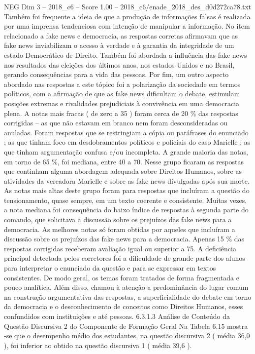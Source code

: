 \begin{textsample}{NEG Dim 3 – 2018\_c6 – Score 1.00 – 2018\_c6/enade\_2018\_des\_d0d272ca78.txt}
Também foi frequente a ideia de que a produção de informações falsas é realizada por uma imprensa tendenciosa com intenção de manipular a informação.
No item relacionado a fake news e democracia, as respostas corretas afirmavam que as fake news inviabilizam o acesso à verdade e à garantia da integridade de um estado Democrático de Direito.
Também foi abordada a influência das fake news nos resultados das eleições dos últimos anos, nos estados Unidos e no Brasil, gerando consequências para a vida das pessoas.
Por fim, um outro aspecto abordado nas respostas a este tópico foi a polarização da sociedade em termos políticos, com a afirmação de que as fake news dificultam o debate, estimulam posições extremas e rivalidades prejudiciais à convivência em uma democracia plena.
A notas mais fracas ( de zero a 35 ) foram cerca de 20 \% das respostas corrigidas – as que não estavam em branco nem foram desconsideradas ou anuladas.
Foram respostas que se restringiam a cópia ou paráfrases do enunciado ; as que tinham foco em desdobramentos políticos e policiais do caso Marielle ; as que tinham argumentação confusa e/ou incompleta.
A grande maioria das notas, em torno de 65 \%, foi mediana, entre 40 a 70.
Nesse grupo ficaram as respostas que continham alguma abordagem adequada sobre Direitos Humanos, sobre as atividades da vereadora Marielle e sobre as fake news divulgadas após sua morte.
As notas mais altas deste grupo foram para respostas que incluíram a questão do tensionamento, quase sempre, em um texto coerente e consistente.
Muitas vezes, a nota mediana foi consequência do baixo índice de respostas à segunda parte do comando, que solicitava a discussão sobre os prejuízos das fake news para a democracia.
As melhores notas só foram obtidas por aqueles que incluíram a discussão sobre os prejuízos das fake news para a democracia.
Apenas 15 \% das respostas corrigidas receberam avaliação igual ou superior a 75.
A deficiência principal detectada pelos corretores foi a dificuldade de grande parte dos alunos para interpretar o enunciado da questão e para se expressar em textos consistentes.
De modo geral, os temas foram tratados de forma fragmentada e pouco analítica.
Além disso, chamou à atenção a predominância do lugar comum na construção argumentativa das respostas, a superficialidade do debate em torno da democracia e o desconhecimento de conceitos como Direitos Humanos, esses confundidos com instituições e até pessoas. 6.3.1.3 Análise de Conteúdo da Questão Discursiva 2 do Componente de Formação Geral Na Tabela 6.15 mostra -se que o desempenho médio dos estudantes, na questão discursiva 2 ( média 36,0 ), foi inferior ao obtido na questão discursiva 1 ( média 39,6 ).

\end{textsample}
